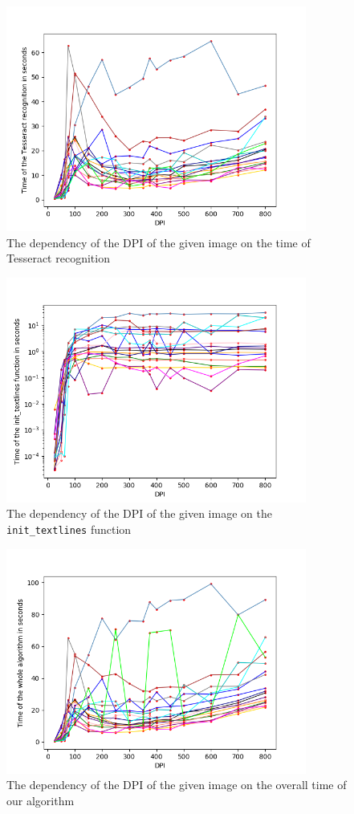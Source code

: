 \begin{figure}
\centering
\includegraphics[height=20em]{img/results/dpiTimeTesseract.png}
\caption{The dependency of the DPI of the given image on the time of Tesseract recognition}
\label{fig:dpiTessTime}
\end{figure}

\begin{figure}
\centering
\includegraphics[height=20em]{img/results/dpiTimeInit.png}
\caption{The dependency of the DPI of the given image on the \texttt{init\_textlines} function}
\label{fig:dpiInitTime}
\end{figure}

\begin{figure}
\centering
\includegraphics[height=20em]{img/results/dpiTimeAll.png}
\caption{The dependency of the DPI of the given image on the overall time of our algorithm}
\label{fig:dpiAllTime}
\end{figure}

